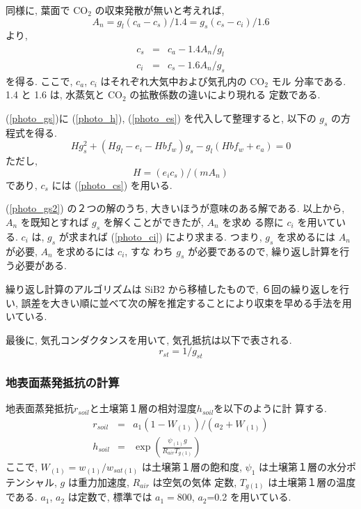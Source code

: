 同様に, 葉面で CO$_2$ の収束発散が無いと考えれば,
\begin{equation}
 A_n = g_l(c_a - c_s)/1.4
     = g_s(c_s - c_i)/1.6
\label{photo_csci}
\end{equation}
より,
\begin{eqnarray}
 c_s &=& c_a - 1.4 A_n/g_l \\
\label{photo_cs}
 c_i &=& c_s - 1.6 A_n/g_s
\label{photo_ci}
\end{eqnarray}
を得る. ここで, $c_a$, $c_i$ はそれぞれ大気中および気孔内の CO$_2$ モル
分率である. 1.4 と 1.6 は, 水蒸気と CO$_2$ の拡散係数の違いにより現れる
定数である.

(\ref{photo_gs})に (\ref{photo_h}), (\ref{photo_es})
を代入して整理すると, 以下の $g_s$ の方程式を得る.
\begin{equation}
 H g_s^2 + ( H g_l - e_i - H b f_w ) g_s - g_l ( H b f_w + e_a ) = 0
\label{photo_gs2}
\end{equation}
ただし,
\begin{equation}
 H = (e_i c_s)/(m A_n)
\end{equation}
であり, $c_s$ には (\ref{photo_cs}) を用いる.

(\ref{photo_gs2}) の２つの解のうち, 大きいほうが意味のある解である.
以上から, $A_n$ を既知とすれば $g_s$ を解くことができたが, $A_n$ を求め
る際に $c_i$ を用いている. $c_i$ は, $g_s$ が求まれば (\ref{photo_ci})
により求まる.
つまり, $g_s$ を求めるには $A_n$ が必要, $A_n$ を求めるには $c_i$, すな
わち $g_s$ が必要であるので, 繰り返し計算を行う必要がある.

繰り返し計算のアルゴリズムは SiB2 から移植したもので, ６回の繰り返しを行
い, 誤差を大きい順に並べて次の解を推定することにより収束を早める手法を用
いている.

最後に, 気孔コンダクタンスを用いて, 気孔抵抗は以下で表される.
\begin{equation}
 r_{st} = 1/g_{st}
\end{equation}

\subsubsection{地表面蒸発抵抗の計算}

地表面蒸発抵抗$r_{soil}$と土壌第１層の相対湿度$h_{soil}$を以下のように計
算する.
\begin{eqnarray}
 r_{soil} &=& a_1 ( 1 - W_{(1)} ) / ( a_2 + W_{(1)} ) \\
 h_{soil} &=& \exp \left(\frac{\psi_{(1)} g}{R_{air} T_{g(1)}} \right)
\end{eqnarray}
ここで, $W_{(1)} = w_{(1)}/w_{sat(1)}$ は土壌第１層の飽和度, $\psi_{1}$
は土壌第１層の水分ポテンシャル, $g$ は重力加速度, $R_{air}$ は空気の気体
定数, $T_{g(1)}$ は土壌第１層の温度である.
$a_1$, $a_2$ は定数で, 標準では $a_1=800$, $a_2$=0.2 を用いている.

